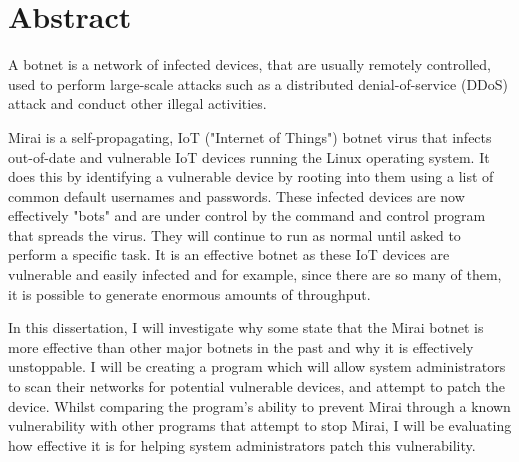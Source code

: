 \chapter*{Abstract}

\begin{flushleft}

A botnet is a network of infected devices, that are usually remotely controlled, used to perform large-scale attacks such as a distributed denial-of-service (DDoS) attack and conduct other illegal activities.

\vspace{0.5cm}\par

Mirai is a self-propagating, IoT ("Internet of Things") botnet virus that infects out-of-date and vulnerable IoT devices running the Linux operating system. It does this by identifying a vulnerable device by rooting into them using a list of common default usernames and passwords. These infected devices are now effectively "bots" and are under control by the command and control program that spreads the virus. They will continue to run as normal until asked to perform a specific task. It is an effective botnet as these IoT devices are vulnerable and easily infected and for example, since there are so many of them, it is possible to generate enormous amounts of throughput.

\vspace{0.5cm}\par

In this dissertation, I will investigate why some state that the Mirai botnet is more effective than other major botnets in the past and why it is effectively unstoppable. I will be creating a program which will allow system administrators to scan their networks for potential vulnerable devices, and attempt to patch the device. Whilst comparing the program's ability to prevent Mirai through a known vulnerability with other programs that attempt to stop Mirai, I will be evaluating how effective it is for helping system administrators patch this vulnerability.

\end{flushleft}
